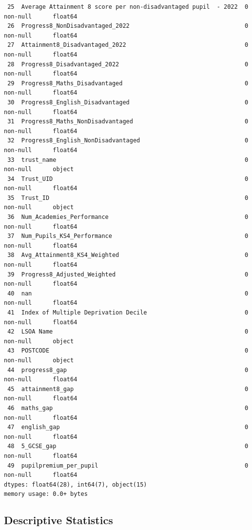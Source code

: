 \documentclass[
  letterpaper,
  DIV=11,
  numbers=noendperiod]{scrartcl}
\begin{document}
\begin{verbatim}
 25  Average Attainment 8 score per non-disadvantaged pupil  - 2022  0 non-null      float64
 26  Progress8_NonDisadvantaged_2022                                 0 non-null      float64
 27  Attainment8_Disadvantaged_2022                                  0 non-null      float64
 28  Progress8_Disadvantaged_2022                                    0 non-null      float64
 29  Progress8_Maths_Disadvantaged                                   0 non-null      float64
 30  Progress8_English_Disadvantaged                                 0 non-null      float64
 31  Progress8_Maths_NonDisadvantaged                                0 non-null      float64
 32  Progress8_English_NonDisadvantaged                              0 non-null      float64
 33  trust_name                                                      0 non-null      object 
 34  Trust_UID                                                       0 non-null      float64
 35  Trust_ID                                                        0 non-null      object 
 36  Num_Academies_Performance                                       0 non-null      float64
 37  Num_Pupils_KS4_Performance                                      0 non-null      float64
 38  Avg_Attainment8_KS4_Weighted                                    0 non-null      float64
 39  Progress8_Adjusted_Weighted                                     0 non-null      float64
 40  nan                                                             0 non-null      float64
 41  Index of Multiple Deprivation Decile                            0 non-null      float64
 42  LSOA Name                                                       0 non-null      object 
 43  POSTCODE                                                        0 non-null      object 
 44  progress8_gap                                                   0 non-null      float64
 45  attainment8_gap                                                 0 non-null      float64
 46  maths_gap                                                       0 non-null      float64
 47  english_gap                                                     0 non-null      float64
 48  5_GCSE_gap                                                      0 non-null      float64
 49  pupilpremium_per_pupil                                          0 non-null      float64
dtypes: float64(28), int64(7), object(15)
memory usage: 0.0+ bytes
\end{verbatim}

\subsection{Descriptive Statistics}\label{descriptive-statistics}
\end{document}
